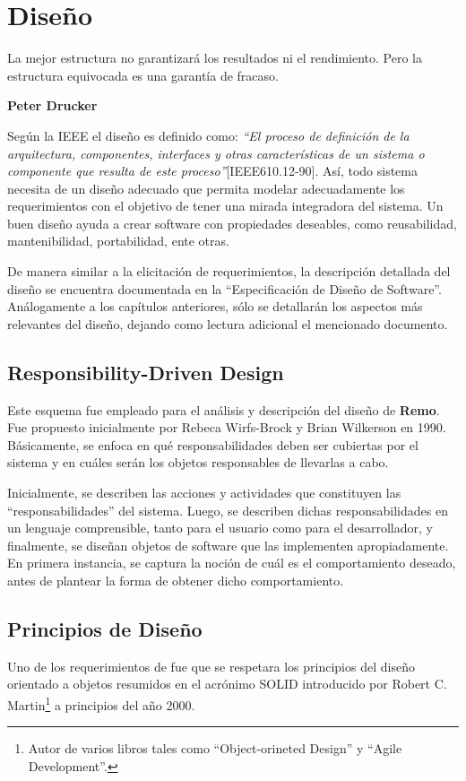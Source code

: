 \chapter{Diseño}
\label{disenio}

\epigraph{La mejor estructura no garantizará los
resultados ni el rendimiento. Pero la
estructura equivocada es una garantía de
fracaso.}%
{\textbf{Peter Drucker}}

\par Según la IEEE el diseño es definido como: \emph{``El proceso de definición de la arquitectura, componentes, interfaces y otras características de un sistema o componente que resulta de este proceso''}[IEEE610.12-90]. Así, todo sistema necesita de un diseño adecuado que permita modelar adecuadamente los requerimientos con el objetivo de tener una mirada integradora del sistema. Un buen diseño ayuda a crear software con propiedades deseables, como reusabilidad, mantenibilidad, portabilidad, ente otras.

\par De manera similar a la elicitación de requerimientos, la descripción detallada del diseño se encuentra documentada en la “Especificación de Diseño de Software”. Análogamente a los capítulos anteriores, sólo se detallarán los aspectos más relevantes del diseño, dejando como lectura adicional el mencionado documento.
 
\section{Responsibility-Driven Design}
\par Este esquema fue empleado para el análisis y descripción del diseño de \textbf{Remo}. Fue propuesto inicialmente por Rebeca Wirfs-Brock y Brian Wilkerson\cite{ResponsibilityDesign} en 1990. Básicamente, se enfoca en qué responsabilidades deben ser cubiertas por el sistema y en cuáles serán los objetos responsables de llevarlas a cabo. 

\par Inicialmente, se describen las acciones y actividades que constituyen las ``responsabilidades'' del sistema. Luego, se describen dichas responsabilidades en un lenguaje comprensible, tanto para el usuario como para el desarrollador, y finalmente, se diseñan objetos de software que las implementen apropiadamente. En primera instancia, se captura la noción de cuál es el comportamiento deseado, antes de plantear la forma de obtener dicho comportamiento.

\section{Principios de Diseño}
\par Uno de los requerimientos de \remo fue que se respetara los principios del diseño orientado a objetos resumidos en el acrónimo SOLID\cite{Martin00} introducido por Robert C. Martin\footnote{Autor de varios libros tales como ``Object-orineted Design'' y ``Agile Development''.} a principios del año 2000.

